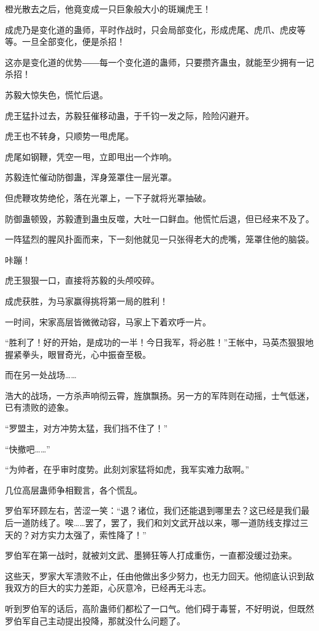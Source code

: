 \begin{this_body}
橙光散去之后，他竟变成一只巨象般大小的斑斓虎王！

成虎乃是变化道的蛊师，平时作战时，只会局部变化，形成虎尾、虎爪、虎皮等等。一旦全部变化，便是杀招！

这亦是变化道的优势――每一个变化道的蛊师，只要攒齐蛊虫，就能至少拥有一记杀招！

苏毅大惊失色，慌忙后退。

虎王猛扑过去，苏毅狂催移动蛊，于千钧一发之际，险险闪避开。

虎王也不转身，只顺势一甩虎尾。

虎尾如钢鞭，凭空一甩，立即甩出一个炸响。

苏毅连忙催动防御蛊，浑身笼罩住一层光罩。

但虎鞭攻势绝伦，落在光罩上，一下子就将光罩抽破。

防御蛊顿毁，苏毅遭到蛊虫反噬，大吐一口鲜血。他慌忙后退，但已经来不及了。

一阵猛烈的腥风扑面而来，下一刻他就见一只张得老大的虎嘴，笼罩住他的脑袋。

咔蹦！

虎王狠狠一口，直接将苏毅的头颅咬碎。

成虎获胜，为马家赢得挑将第一局的胜利！

一时间，宋家高层皆微微动容，马家上下着欢呼一片。

“胜利了！好的开始，是成功的一半！今日我军，将必胜！”王帐中，马英杰狠狠地握紧拳头，眼冒奇光，心中振奋至极。

而在另一处战场……

浩大的战场，一方杀声响彻云霄，旌旗飘扬。另一方的军阵则在动摇，士气低迷，已有溃败的迹象。

“罗盟主，对方冲势太猛，我们挡不住了！”

“快撤吧……”

“为帅者，在乎审时度势。此刻刘家猛将如虎，我军实难力敌啊。”

几位高层蛊师争相觐言，各个慌乱。

罗伯军环顾左右，苦涩一笑：“退？诸位，我们还能退到哪里去？这已经是我们最后一道防线了。唉……罢了，罢了，我们和刘文武开战以来，哪一道防线支撑过三天的？对方实力太强了，索性降了！”

罗伯军在第一战时，就被刘文武、墨狮狂等人打成重伤，一直都没缓过劲来。

这些天，罗家大军溃败不止，任由他做出多少努力，也无力回天。他彻底认识到敌我双方的巨大的实力差距，心灰意冷，已经再无斗志。

听到罗伯军的话后，高阶蛊师们都松了一口气。他们碍于毒誓，不好明说，但既然罗伯军自己主动提出投降，那就没什么问题了。


\end{this_body}
